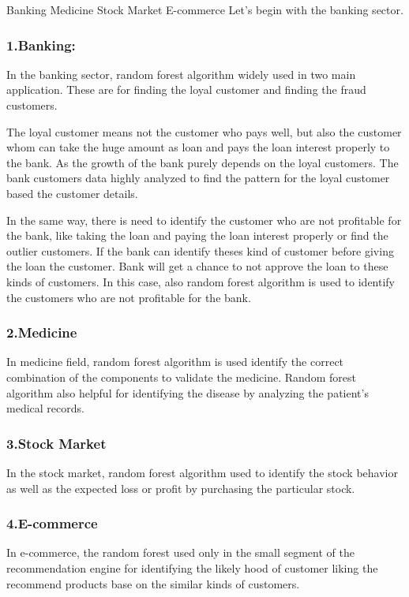 Banking
Medicine
Stock Market
E-commerce
Let’s begin with the banking sector.

\subsubsection*{1.Banking:}
In the banking sector, random forest algorithm widely used in two main application. These are for finding the loyal customer and finding the fraud customers.

The loyal customer means not the customer who pays well, but also the customer whom can take the huge amount as loan and pays the loan interest properly to the bank. As the growth of the bank purely depends on the loyal customers. The bank customers data highly analyzed to find the pattern for the loyal customer based the customer details.

In the same way, there is need to identify the customer who are not profitable for the bank, like taking the loan and paying the loan interest properly or find the outlier customers. If the bank can identify theses kind of customer before giving the loan the customer.  Bank will get a chance to not approve the loan to these kinds of customers. In this case, also random forest algorithm is used to identify the customers who are not profitable for the bank.

\subsubsection*{2.Medicine}
In medicine field, random forest algorithm is used identify the correct combination of the components to validate the medicine. Random forest algorithm also helpful for identifying the disease by analyzing the patient’s medical records.

\subsubsection*{3.Stock Market}
In the stock market, random forest algorithm used to identify the stock behavior as well as the expected loss or profit by purchasing the particular stock.

\subsubsection*{4.E-commerce}
In e-commerce, the random forest used only in the small segment of the recommendation engine for identifying the likely hood of customer liking the recommend products base on the similar kinds of customers.

